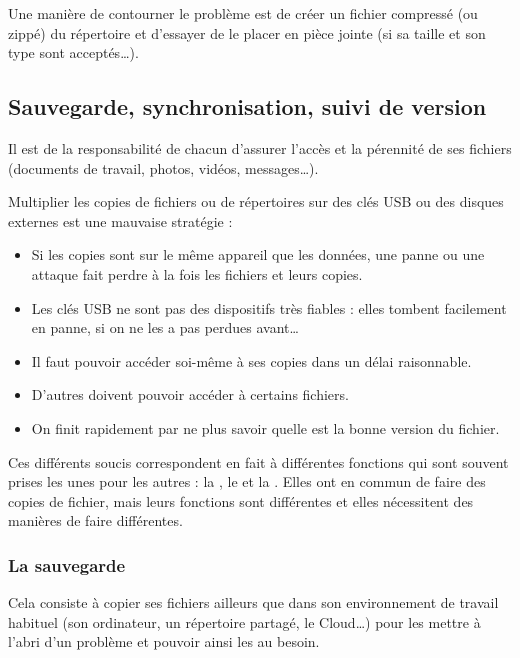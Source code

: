 \documentclass[10pt,a4paper]{report}
\begin{document}
Une manière de contourner le problème est de créer un fichier compressé (ou zippé) du répertoire et d'essayer de le placer en pièce jointe (si sa taille et son type sont acceptés\dots).



\subsection{Sauvegarde, synchronisation, suivi de version}

Il est de la responsabilité de chacun d'assurer l'accès et la pérennité de ses fichiers (documents de travail, photos, vidéos, messages\dots).

\attention Multiplier les copies de fichiers ou de répertoires sur des clés USB ou des disques externes est une mauvaise stratégie :
\begin{itemize}
	\item Si les copies sont sur le même appareil que les données, une panne ou une attaque fait perdre à la fois les fichiers et leurs copies.
	\item Les clés USB ne sont pas des dispositifs très fiables : elles tombent facilement en panne, si on ne les a pas perdues avant\dots
	\item Il faut pouvoir accéder soi-même à ses copies dans un délai raisonnable.
	\item D'autres doivent pouvoir accéder à certains fichiers.
	\item On finit rapidement par ne plus savoir quelle est la bonne version du fichier.
\end{itemize}

Ces différents soucis correspondent en fait à différentes fonctions qui sont souvent prises les unes pour les autres : la , le  et la . Elles ont en commun de faire des copies de fichier, mais leurs fonctions sont différentes et elles nécessitent des manières de faire différentes.


\subsubsection{La sauvegarde}

Cela consiste à copier ses fichiers ailleurs que dans son environnement de travail habituel (son ordinateur, un répertoire partagé, le Cloud\dots) pour les mettre à l'abri d'un problème et pouvoir ainsi les  au besoin.
\end{document}
